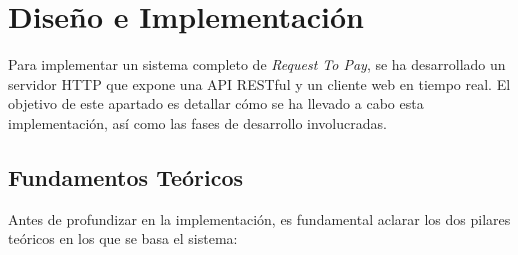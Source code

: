 \section{Diseño e Implementación}
\label{sec:DisenoImplementacion}
Para implementar un sistema completo de \textit{Request To Pay}, se ha desarrollado un servidor HTTP que expone una API RESTful y un cliente web en tiempo real. El objetivo de este apartado es detallar cómo se ha llevado a cabo esta implementación, así como las fases de desarrollo involucradas.

\subsection{Fundamentos Teóricos}
Antes de profundizar en la implementación, es fundamental aclarar los dos pilares teóricos en los que se basa el sistema:

